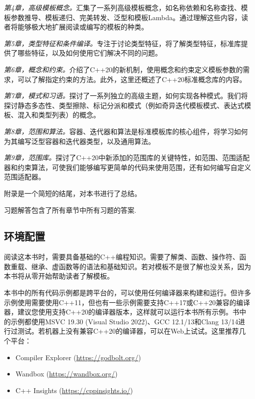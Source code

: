 \textit{第4章，高级模板概念。}汇集了一系列高级模板概念，如名称依赖和名称查找、模板参数推导、模板递归、完美转发、泛型和模板Lambda。通过理解这些内容，读者将能够极大地扩展阅读或编写的模板的种类。

\textit{第5章，类型特征和条件编译。}专注于讨论类型特征，将了解类型特征，标准库提供了哪些特征，以及如何使用它们解决不同的问题。

\textit{第6章，概念和约束。}介绍了C++20的新机制，使用概念和约束定义模板参数的需求，可以了解指定约束的方法。此外，这里还概述了C++20标准概念库的内容。

\textit{第7章，模式和习语。}探讨了一系列独立的高级主题，如何实现各种模式。我们将探讨静态多态性、类型擦除、标记分派和模式（例如奇异迭代模板模式、表达式模板、混入和类型列表）的概念。

\textit{第8章，范围和算法。}容器、迭代器和算法是标准模板库的核心组件，将学习如何为其编写泛型容器和迭代器类型，以及通用算法。

\textit{第9章，范围库。}探讨了C++20中新添加的范围库的关键特性，如范围、范围适配器和约束算法，可使我们能够编写更简单的代码来使用范围，还有如何编写自定义范围适配器。

附录是一个简短的结尾，对本书进行了总结。

习题解答包含了所有章节中所有习题的答案.

\subsection{环境配置}

阅读这本书时，需要具备基础的C++编程知识。需要了解类、函数、操作符、函数重载、继承、虚函数等的语法和基础知识。若对模板不是很了解也没关系，因为本书将从零开始帮助读者了解模板。

本书中的所有代码示例都是跨平台的，可以使用任何编译器来构建和运行。但许多示例使用需要使用C++11，但也有一些示例需要支持C++17或C++20兼容的编译器，建议您使用支持C++20的编译器版本，这样就可以运行本书所有示例。书中的示例都使用MSVC 19.30 (Visual Studio 2022)、GCC 12.1/13和Clang 13/14进行过测试。若机器上没有兼容C++20的编译器，可以在Web上试试。这里推荐几个平台：

\begin{itemize}
\item
Compiler Explorer (\url{https://godbolt.org/})

\item
Wandbox (\url{https://wandbox.org/})

\item
C++ Insights (\url{https://cppinsights.io/})
\end{itemize}

